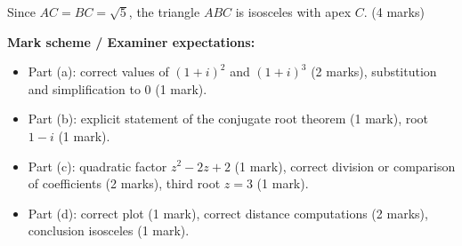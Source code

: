 \documentclass[11pt]{article}
\begin{document}
\begin{corrige}
\begin{enumerate}
\[\]
Since $AC = BC = \sqrt{5}$, the triangle $ABC$ is isosceles with apex $C$. \hfill (4 marks)
\end{enumerate}
\textbf{Mark scheme / Examiner expectations:}
\begin{itemize}
\item Part (a): correct values of $(1+i)^2$ and $(1+i)^3$ (2 marks), substitution and simplification to $0$ (1 mark).
\item Part (b): explicit statement of the conjugate root theorem (1 mark), root $1-i$ (1 mark).
\item Part (c): quadratic factor $z^2 - 2z + 2$ (1 mark), correct division or comparison of coefficients (2 marks), third root $z = 3$ (1 mark).
\item Part (d): correct plot (1 mark), correct distance computations (2 marks), conclusion isosceles (1 mark).
\end{itemize}
\end{corrige}
\end{document}
